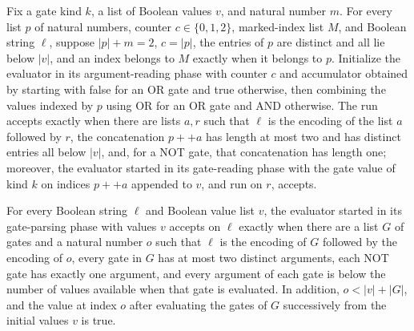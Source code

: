 \begin{theorem}
\label{BoolCircuit.CircuitEval.absRun_a}
\leanok
{}
Fix a gate kind $k$, a list of Boolean values $v$, and natural number $m$. For every
list $p$ of natural numbers, counter $c\in\{0,1,2\}$, marked-index list $M$, and Boolean
string $\ell$, suppose $|p|+m=2$, $c=|p|$, the entries of $p$ are distinct and all lie
below $|v|$, and an index belongs to $M$ exactly when it belongs to $p$. Initialize the
evaluator in its argument-reading phase with counter $c$ and accumulator obtained by
starting with false for an OR gate and true otherwise, then combining the values indexed
by $p$ using OR for an OR gate and AND otherwise. The run accepts exactly when there are
lists $a,r$ such that $\ell$ is the encoding of the list $a$ followed by $r$, the
concatenation $p++a$ has length at most two and has distinct entries all below $|v|$,
and, for a NOT gate, that concatenation has length one; moreover, the evaluator started
in its gate-reading phase with the gate value of kind $k$ on indices $p++a$ appended to
$v$, and run on $r$, accepts.
\end{theorem}

\begin{theorem}
\label{BoolCircuit.CircuitEval.absRun_g}
\leanok
{}
For every Boolean string $\ell$ and Boolean value list $v$, the evaluator started in its
gate-parsing phase with values $v$ accepts on $\ell$ exactly when there are a list $G$
of gates and a natural number $o$ such that $\ell$ is the encoding of $G$ followed by
the encoding of $o$, every gate in $G$ has at most two distinct arguments, each NOT gate
has exactly one argument, and every argument of each gate is below the number of values
available when that gate is evaluated. In addition, $o<|v|+|G|$, and the value at index
$o$ after evaluating the gates of $G$ successively from the initial values $v$ is true.
\end{theorem}


